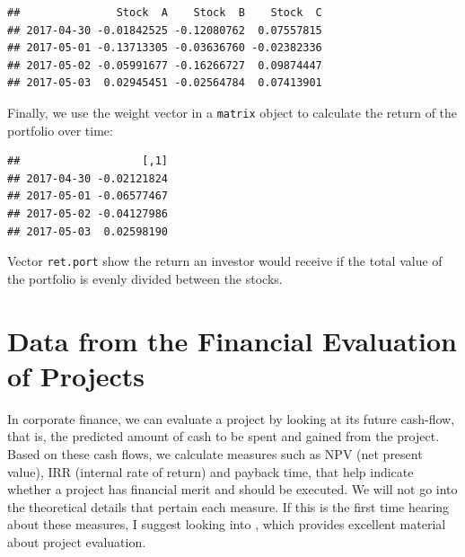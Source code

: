 \documentclass[11pt,]{book}
\newenvironment{Shaded}{\begin{snugshade}}{\end{snugshade}}
\newcommand{\KeywordTok}[1]{\textcolor[rgb]{0.27,0.27,0.27}{\textbf{#1}}}
\newcommand{\DataTypeTok}[1]{\textcolor[rgb]{0.27,0.27,0.27}{#1}}
\newcommand{\DecValTok}[1]{\textcolor[rgb]{0.06,0.06,0.06}{#1}}
\newcommand{\StringTok}[1]{\textcolor[rgb]{0.5,0.5,0.5}{#1}}
\newcommand{\CommentTok}[1]{\textcolor[rgb]{0.56,0.35,0.01}{\textit{#1}}}
\newcommand{\OperatorTok}[1]{\textcolor[rgb]{0.81,0.36,0.00}{\textbf{#1}}}
\newcommand{\NormalTok}[1]{#1}
\begin{document}
\begin{verbatim}
##               Stock  A    Stock  B    Stock  C
## 2017-04-30 -0.01842525 -0.12080762  0.07557815
## 2017-05-01 -0.13713305 -0.03636760 -0.02382336
## 2017-05-02 -0.05991677 -0.16266727  0.09874447
## 2017-05-03  0.02945451 -0.02564784  0.07413901
\end{verbatim}

Finally, we use the weight vector in a \texttt{matrix} object to
calculate the return of the portfolio over time:

\begin{Shaded}
\end{Shaded}

\begin{verbatim}
##                   [,1]
## 2017-04-30 -0.02121824
## 2017-05-01 -0.06577467
## 2017-05-02 -0.04127986
## 2017-05-03  0.02598190
\end{verbatim}

Vector \texttt{ret.port} show the return an investor would receive if
the total value of the portfolio is evenly divided between the stocks.

\section{Data from the Financial Evaluation of
Projects}\label{data-from-the-financial-evaluation-of-projects}

In corporate finance, we can evaluate a project by looking at its future
cash-flow, that is, the predicted amount of cash to be spent and gained
from the project. Based on these cash flows, we calculate measures such
as NPV (net present value), IRR (internal rate of return) and payback
time, that help indicate whether a project has financial merit and
should be executed. We will not go into the theoretical details that
pertain each measure. If this is the first time hearing about these
measures, I suggest looking into \citet{ross2008fundamentals}, which
provides excellent material about project evaluation.
\end{document}
